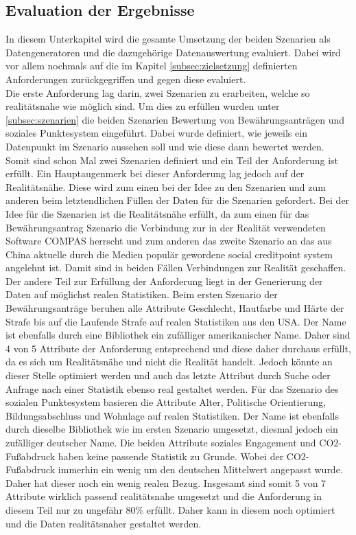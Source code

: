 \begin{onehalfspace}
\section{Evaluation der Ergebnisse}
\label{evaluation}
In diesem Unterkapitel wird die gesamte Umsetzung der beiden Szenarien als Datengeneratoren und die dazugehörige Datenauswertung evaluiert. Dabei wird vor allem nochmals auf die im Kapitel \ref{subsec:zielsetzung} definierten Anforderungen zurückgegriffen und gegen diese evaluiert.\\
Die erste Anforderung lag darin, zwei Szenarien zu erarbeiten, welche so realitätsnahe wie möglich sind. Um dies zu erfüllen wurden unter \ref{subsec:szenarien} die beiden Szenarien Bewertung von Bewährungsanträgen und soziales Punktesystem eingeführt. Dabei wurde definiert, wie jeweils ein Datenpunkt im Szenario aussehen soll und wie diese dann bewertet werden. Somit sind schon Mal zwei Szenarien definiert und ein Teil der Anforderung ist erfüllt. Ein Hauptaugenmerk bei dieser Anforderung lag jedoch auf der Realitätsnähe. Diese wird zum einen bei der Idee zu den Szenarien und zum anderen beim letztendlichen Füllen der Daten für die Szenarien gefordert. Bei der Idee für die Szenarien ist die Realitätsnähe erfüllt, da zum einen für das Bewährungsantrag Szenario die Verbindung zur in der Realität verwendeten Software \glqq{}COMPAS\grqq{} herrscht und zum anderen das zweite Szenario an das aus China aktuelle durch die Medien populär gewordene social creditpoint system angelehnt ist. Damit sind in beiden Fällen Verbindungen zur Realität geschaffen. Der andere Teil zur Erfüllung der Anforderung liegt in der Generierung der Daten auf möglichst realen Statistiken. Beim ersten Szenario der Bewährungsanträge beruhen alle Attribute Geschlecht, Hautfarbe und Härte der Strafe bis auf die Laufende Strafe auf realen Statistiken aus den USA. Der Name ist ebenfalls durch eine Bibliothek ein zufälliger amerikanischer Name. Daher sind 4 von 5 Attribute der Anforderung entsprechend und diese daher durchaus erfüllt, da es sich um Realitätsnähe und nicht die Realität handelt. Jedoch könnte an dieser Stelle optimiert werden und auch das letzte Attribut durch Suche oder Anfrage nach einer Statistik ebenso real gestaltet werden. Für das Szenario des sozialen Punktesystem basieren die Attribute Alter, Politische Orientierung, Bildungsabschluss und Wohnlage auf realen Statistiken. Der Name ist ebenfalls durch dieselbe Bibliothek wie im ersten Szenario umgesetzt, diesmal jedoch ein zufälliger deutscher Name. Die beiden Attribute soziales Engagement und CO2-Fußabdruck haben keine passende Statistik zu Grunde. Wobei der CO2-Fußabdruck immerhin ein wenig um den deutschen Mittelwert angepasst wurde. Daher hat dieser noch ein wenig realen Bezug. Insgesamt sind somit 5 von 7 Attribute wirklich passend realitätsnahe umgesetzt und die Anforderung in diesem Teil nur zu ungefähr 80\% erfüllt. Daher kann in diesem noch optimiert und die Daten realitätsnaher gestaltet werden.\\

\end{onehalfspace}
